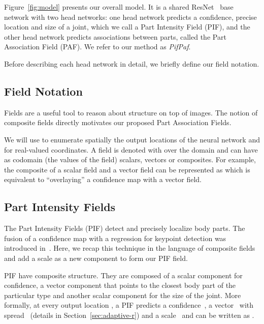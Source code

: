 \documentclass[10pt,twocolumn,letterpaper]{article}
\begin{document}
Figure~\ref{fig:model} presents our overall model. It is a shared
ResNet~\cite{he2016deep} base network with two head networks:
one head network predicts a confidence, precise location and size of a joint, which we
call a Part Intensity Field (PIF), and the other head network predicts associations between parts, called the Part Association Field (PAF). We refer to our method as \textit{PifPaf}.

Before describing each head network in detail, we briefly define our field notation.

\subsection{Field Notation}

Fields are a useful tool to reason about structure on top of images.
The notion of composite fields
directly motivates our proposed Part Association Fields.

We will use  to enumerate spatially the output locations of the neural
network and  for real-valued coordinates. A field is denoted with
 over the domain  and can have
as codomain (the values of the field) scalars, vectors or composites.
For example, the composite of a scalar field   and a vector field 
can be represented as 
which is equivalent to ``overlaying'' a
confidence map with a vector field.


\subsection{Part Intensity Fields}

The Part Intensity Fields (PIF) detect and precisely localize body parts.
The fusion of a confidence map with a regression
for keypoint detection was introduced in~\cite{papandreou2017towards}.
Here, we recap this technique in the language of composite fields and add
a scale  as a new component to form our PIF field.

PIF have composite structure. They are
composed of a scalar component for confidence, a vector component that points
to the closest body part of the particular type and another scalar component for the size of the joint.  More formally, at every output location , a PIF predicts a confidence~,
a vector~ with spread~ (details in Section~\ref{sec:adaptive-r}) and a scale~ and can be written as
.
\end{document}
